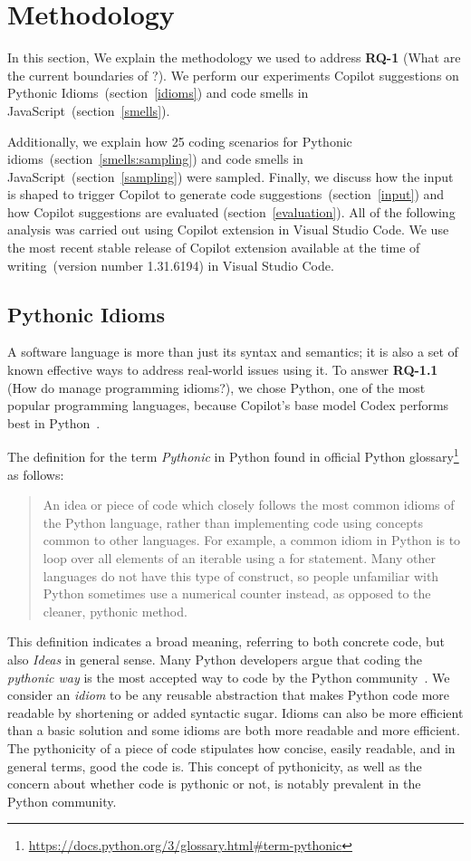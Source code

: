 \section{Methodology}
\label{methodology}
In this section, We explain the methodology we used to address \textbf{RQ-1} (What are the current boundaries of \cct{}?). We perform our experiments Copilot suggestions on Pythonic Idioms~(section~\ref{idioms}) and code smells in JavaScript~(section~\ref{smells}).

Additionally, we explain how 25 coding scenarios for Pythonic idioms~(section~\ref{smells:sampling}) and code smells in JavaScript~(section~\ref{sampling}) were sampled.
Finally, we discuss how the input is shaped to trigger Copilot to generate code suggestions~(section~\ref{input}) and how Copilot suggestions are evaluated (section~\ref{evaluation}).
All of the following analysis was carried out using Copilot extension in Visual Studio Code. We use the most recent stable release of Copilot extension available at the time of writing~(version number 1.31.6194) in Visual Studio Code.

\subsection{Pythonic Idioms}
\label{python}
A software language is more than just its syntax and semantics; it is also a set of known effective ways to address real-world issues using it. 
To answer \textbf{RQ-1.1} (How do \cct{} manage programming idioms?),
we chose Python, one of the most popular programming languages, because Copilot's base model Codex performs best in Python~\cite{copilot}.  

The definition for the term \emph{Pythonic} in Python found in official Python glossary\footnote{\url{https://docs.python.org/3/glossary.html\#term-pythonic}} as follows:

\begin{quote}
    An idea or piece of code which closely follows the most common idioms of the Python language, rather than implementing code using concepts common to other languages. For example, a common idiom in Python is to loop over all elements of an iterable using a for statement. Many other languages do not have this type of construct, so people unfamiliar with Python sometimes use a numerical counter instead, as opposed to the cleaner, pythonic method.
\end{quote}

This definition indicates a broad meaning, referring to both concrete code, but also \emph{Ideas} in general sense. Many Python developers argue that coding the \emph{pythonic way} is the most accepted way to code by the Python community~\cite{Alexandru2018}. 
We consider an \emph{idiom} to be any reusable abstraction that makes Python code more readable by shortening or added syntactic sugar. Idioms can also be more efficient than a basic solution and some idioms are both more readable and more efficient.
The pythonicity of a piece of code stipulates how concise, easily readable, and in general terms, good the code is. This concept of pythonicity, as well as the concern about whether code is pythonic or not, is notably prevalent in the Python community.

